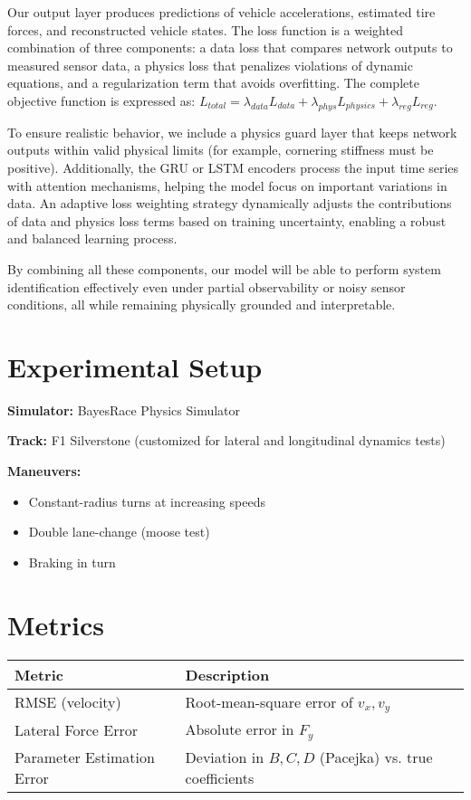 \documentclass{article}
\begin{document}
Our output layer produces predictions of vehicle accelerations, estimated tire forces, and reconstructed vehicle states. The loss function is a weighted combination of three components: a data loss that compares network outputs to measured sensor data, a physics loss that penalizes violations of dynamic equations, and a regularization term that avoids overfitting. The complete objective function is expressed as: $L_{total} = \lambda_{data} L_{data} + \lambda_{phys} L_{physics} + \lambda_{reg} L_{reg}$.

To ensure realistic behavior, we include a physics guard layer that keeps network outputs within valid physical limits (for example, cornering stiffness must be positive). Additionally, the GRU or LSTM encoders process the input time series with attention mechanisms, helping the model focus on important variations in data. An adaptive loss weighting strategy dynamically adjusts the contributions of data and physics loss terms based on training uncertainty, enabling a robust and balanced learning process.

By combining all these components, our model will be able to perform system identification effectively even under partial observability or noisy sensor conditions, all while remaining physically grounded and interpretable.

\section{Experimental Setup}

\textbf{Simulator:} BayesRace Physics Simulator

\textbf{Track:} F1 Silverstone (customized for lateral and longitudinal dynamics tests)

\textbf{Maneuvers:}
\begin{itemize}
    \item Constant-radius turns at increasing speeds
    \item Double lane-change (moose test)
    \item Braking in turn
\end{itemize}

\section{Metrics}

\begin{tabular}{ll}
\textbf{Metric} & \textbf{Description} \\
\hline
RMSE (velocity) & Root-mean-square error of $v_x, v_y$ \\
Lateral Force Error & Absolute error in $F_y$ \\
Parameter Estimation Error & Deviation in $B, C, D$ (Pacejka) vs. true coefficients \\
\end{tabular}
\end{document}
